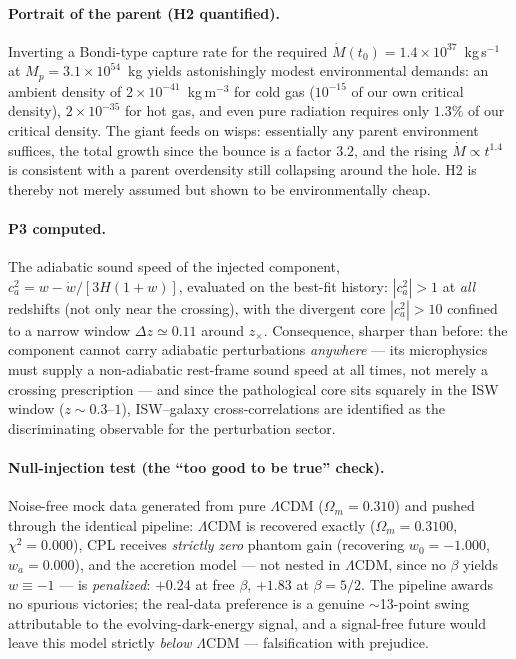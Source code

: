\documentclass[11pt]{article}
\begin{document}
\paragraph{Portrait of the parent (H2 quantified).} Inverting a Bondi-type capture rate for the required $\dot M(t_0) = 1.4\times10^{37}$~kg\,s$^{-1}$ at $M_p = 3.1\times10^{54}$~kg yields astonishingly modest environmental demands: an ambient density of $2\times10^{-41}$~kg\,m$^{-3}$ for cold gas ($10^{-15}$ of our own critical density), $2\times10^{-35}$ for hot gas, and even pure radiation requires only $1.3\%$ of our critical density. The giant feeds on wisps: essentially any parent environment suffices, the total growth since the bounce is a factor $3.2$, and the rising $\dot M \propto t^{1.4}$ is consistent with a parent overdensity still collapsing around the hole. H2 is thereby not merely assumed but shown to be environmentally cheap.

\paragraph{P3 computed.} The adiabatic sound speed of the injected component, $c_a^2 = w - \dot w/[3H(1+w)]$, evaluated on the best-fit history: $|c_a^2| > 1$ at \emph{all} redshifts (not only near the crossing), with the divergent core $|c_a^2|>10$ confined to a narrow window $\Delta z \simeq 0.11$ around $z_\times$. Consequence, sharper than before: the component cannot carry adiabatic perturbations \emph{anywhere} --- its microphysics must supply a non-adiabatic rest-frame sound speed at all times, not merely a crossing prescription --- and since the pathological core sits squarely in the ISW window ($z \sim 0.3$--$1$), ISW--galaxy cross-correlations are identified as the discriminating observable for the perturbation sector.

\paragraph{Null-injection test (the ``too good to be true'' check).} Noise-free mock data generated from pure $\Lambda$CDM ($\Omega_m = 0.310$) and pushed through the identical pipeline: $\Lambda$CDM is recovered exactly ($\Omega_m = 0.3100$, $\chi^2 = 0.000$), CPL receives \emph{strictly zero} phantom gain (recovering $w_0 = -1.000$, $w_a = 0.000$), and the accretion model --- not nested in $\Lambda$CDM, since no $\beta$ yields $w \equiv -1$ --- is \emph{penalized}: $+0.24$ at free $\beta$, $+1.83$ at $\beta = 5/2$. The pipeline awards no spurious victories; the real-data preference is a genuine $\sim$13-point swing attributable to the evolving-dark-energy signal, and a signal-free future would leave this model strictly \emph{below} $\Lambda$CDM --- falsification with prejudice.
\end{document}
